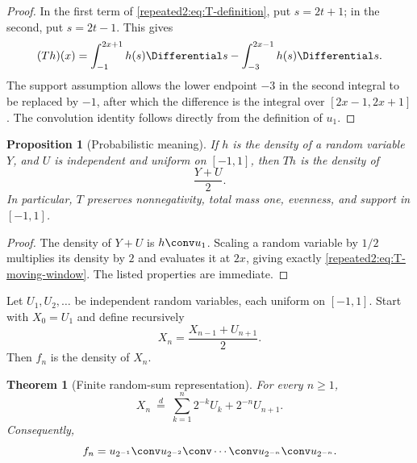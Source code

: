 \documentclass[11pt,oneside]{article}
\newtheorem{theorem}{Theorem}[section]
\newtheorem{proposition}[proposition]{Proposition}
\theoremstyle{definition}
\theoremstyle{remark}
\begin{document}
\begin{proof}
In the first term of \eqref{repeated2:eq:T-definition}, put $s=2t+1$; in the second, put
$s=2t-1$.  This gives
\[
 (Th)(x)=\int_{-1}^{2x+1}h(s)\Differential s-\int_{-3}^{2x-1}h(s)\Differential s.
\]
The support assumption allows the lower endpoint $-3$ in the second integral to be
replaced by $-1$, after which the difference is the integral over $[2x-1,2x+1]$.
The convolution identity follows directly from the definition of $u_1$.
\end{proof}

\begin{proposition}[Probabilistic meaning]
\label{repeated2:prop:T-probability}
If $h$ is the density of a random variable $Y$, and $U$ is independent and uniform on
$[-1,1]$, then $Th$ is the density of
\begin{equation}
 \frac{Y+U}{2}.
 \label{repeated2:eq:T-random-map}
\end{equation}
In particular, $T$ preserves nonnegativity, total mass one, evenness, and support in
$[-1,1]$.
\end{proposition}

\begin{proof}
The density of $Y+U$ is $h\conv u_1$.  Scaling a random variable by $1/2$ multiplies its
density by $2$ and evaluates it at $2x$, giving exactly \eqref{repeated2:eq:T-moving-window}.
The listed properties are immediate.
\end{proof}

Let $U_1,U_2,\ldots$ be independent random variables, each uniform on $[-1,1]$.
Start with $X_0=U_1$ and define recursively
\begin{equation}
 X_n=\frac{X_{n-1}+U_{n+1}}{2}.
 \label{repeated2:eq:X-recursion}
\end{equation}
Then $f_n$ is the density of $X_n$.

\begin{theorem}[Finite random-sum representation]
\label{repeated2:thm:finite-random-sum}
For every $n\ge1$,
\begin{equation}
 X_n\ \stackrel{d}{=}\
 \sum_{k=1}^{n}2^{-k}U_k+2^{-n}U_{n+1}.
 \label{repeated2:eq:Xn-random-sum}
\end{equation}
Consequently,
\begin{equation}
 f_n=u_{2^{-1}}\conv u_{2^{-2}}\conv\cdots\conv
 u_{2^{-n}}\conv u_{2^{-n}}.
 \label{repeated2:eq:fn-box-convolution}
\end{equation}
\end{theorem}
\end{document}
